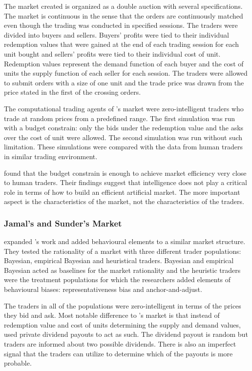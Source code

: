 The market \citet{God93} created is organized as a double auction with several
specifications. The market is continuous in the sense that the 
orders are continuously matched even though the trading was
conducted in specified sessions. The traders were divided 
into buyers and sellers. Buyers' profits were tied to their 
individual redemption values that were gained at the end of
each trading session for each unit bought and sellers' profits
were tied to their individual cost of unit. Redemption values
represent the demand function of each buyer and the cost of units 
the supply function of each seller for each session. The
traders were allowed to submit orders with a size of one unit
and the trade price was drawn from the price stated in the 
first of the crossing orders.

The computational trading agents of \citet{God93}'s market were zero-intelligent traders 
who trade at random prices from a predefined range. 
The first simulation was run with a budget constrain: only the bids
under the redemption value and the asks over the cost of unit 
were allowed. The second simulation was run without such limitation.
These simulations were compared with the data from human traders
in similar trading environment.

\citet{God93} found that the budget constrain is enough to 
achieve market efficiency very close to human traders. Their findings
suggest that intelligence does not play a critical role in terms of 
how to build an efficient artificial market. The more important aspect
is the characteristics of the market, not the characteristics of the traders.

\subsubsection{Jamal's and Sunder's Market}
\citet{Jam96} expanded \citeauthor{God93}'s work and added behavioural 
elements to a similar market structure. They tested the rationality of
a market with three different trader populations: Bayesian, empirical
Bayesian and heuristical traders. Bayesian and empirical Bayesian acted
as baselines for the market rationality and the heuristic traders were
the treatment populations for which the researchers added elements of behavioural
biases: representativeness bias and anchor-and-adjust. 

The traders in all of the populations were zero-intelligent in terms of the
prices they bid and ask. Most notable difference to \citet{God93}'s market
is that instead of redemption value and cost of units determining the
supply and demand values, \citeauthor{Jam96} used private dividend payouts 
to act as such. The dividend payout is random but traders are informed
about two possible dividends. There is also an imperfect signal that the
traders can utilize to determine which of the payouts is more probable. 

